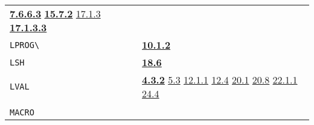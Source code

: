 \documentclass[a4paper,]{article}
\begin{document}
\begin{longtable}[]{@{}ll@{}}
\begin{minipage}[t]{0.70\columnwidth}
\textbf{\href{07-structured-objects.md\#7663-lparse-1}{7.6.6.3}}
\textbf{\href{15-lexical-blocking.md\#1572-parse-and-lparse-again}{15.7.2}}
\href{17-macro-operations.md\#1713-program-defined-macro-characters}{17.1.3}
\textbf{\href{17-macro-operations.md\#17133-parse-and-lparse-finally}{17.1.3.3}}\strut
\end{minipage}\tabularnewline
\begin{minipage}[t]{0.24\columnwidth}\raggedright\strut
\texttt{LPROG\textbackslash{}}\strut
\end{minipage} & \begin{minipage}[t]{0.70\columnwidth}\raggedright\strut
\textbf{\href{10-looping.md\#1012-again-and-return-in-prog-and-repeat-1}{10.1.2}}\strut
\end{minipage}\tabularnewline
\begin{minipage}[t]{0.24\columnwidth}\raggedright\strut
\texttt{LSH}\strut
\end{minipage} & \begin{minipage}[t]{0.70\columnwidth}\raggedright\strut
\textbf{\href{18-machine-words-and-bits.md\#186-bitwise-shifting-operations}{18.6}}\strut
\end{minipage}\tabularnewline
\begin{minipage}[t]{0.24\columnwidth}\raggedright\strut
\texttt{LVAL}\strut
\end{minipage} & \begin{minipage}[t]{0.70\columnwidth}\raggedright\strut
\textbf{\href{04-values-of-atoms.md\#432-lval-1}{4.3.2}}
\href{05-simple-functions.md\#53-application-of-functions-binding-1}{5.3} \href{12-locatives.md\#1211-lloc}{12.1.1}
\href{12-locatives.md\#124-note-on-locatives}{12.4} \href{20-coroutines.md\#201-process-the-type}{20.1}
\href{20-coroutines.md\#208-sneakiness-with-processes}{20.8}
\href{22-storage-management.md\#2211-stacks-and-other-internal-vectors}{22.1.1}
\href{24-efficiency-and-tastefulness.md\#244-global-and-local-values}{24.4}\strut
\end{minipage}\tabularnewline
\begin{minipage}[t]{0.24\columnwidth}\raggedright\strut
\strut
\end{minipage} & \begin{minipage}[t]{0.70\columnwidth}\raggedright\strut
\strut
\end{minipage}\tabularnewline
\begin{minipage}[t]{0.24\columnwidth}\raggedright\strut
\texttt{MACRO}\strut
\end{minipage} & \begin{minipage}[t]{0.70\columnwidth}\raggedright\strut

\end{minipage}
\end{longtable}
\end{document}
